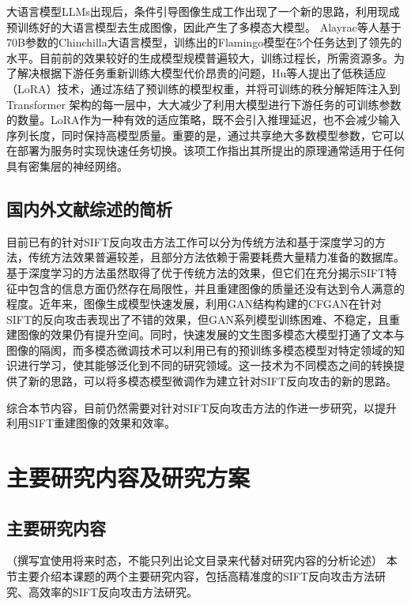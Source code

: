 大语言模型LLMs出现后，条件引导图像生成工作出现了一个新的思路，利用现成预训练好的大语言模型去生成图像，因此产生了多模态大模型\cite{zhang2024mmllmsrecentadvancesmultimodal}。
Alayrac\cite{NEURIPS2022_960a172b}等人基于70B参数的Chinchilla大语言模型，训练出的Flamingo模型在5个任务达到了领先的水平。目前前的效果较好的生成模型规模普遍较大，训练过程长，所需资源多。为了解决根据下游任务重新训练大模型代价昂贵的问题，Hu\cite{hu2021loralowrankadaptationlarge}等人提出了低秩适应（LoRA）技术，通过冻结了预训练的模型权重，并将可训练的秩分解矩阵注入到 Transformer 架构的每一层中，大大减少了利用大模型进行下游任务的可训练参数的数量。LoRA作为一种有效的适应策略，既不会引入推理延迟，也不会减少输入序列长度，同时保持高模型质量。重要的是，通过共享绝大多数模型参数，它可以在部署为服务时实现快速任务切换。该项工作指出其所提出的原理通常适用于任何具有密集层的神经网络。

\subsection{国内外文献综述的简析}
目前已有的针对SIFT反向攻击方法工作可以分为传统方法和基于深度学习的方法，传统方法效果普遍较差，且部分方法依赖于需要耗费大量精力准备的数据库。基于深度学习的方法虽然取得了优于传统方法的效果，但它们在充分揭示SIFT特征中包含的信息方面仍然存在局限性，并且重建图像的质量还没有达到令人满意的程度。近年来，图像生成模型快速发展，利用GAN结构构建的CFGAN在针对SIFT的反向攻击表现出了不错的效果，但GAN系列模型训练困难、不稳定，且重建图像的效果仍有提升空间。同时，快速发展的文生图多模态大模型打通了文本与图像的隔阂，而多模态微调技术可以利用已有的预训练多模态模型对特定领域的知识进行学习，使其能够泛化到不同的研究领域。这一技术为不同模态之间的转换提供了新的思路，可以将多模态模型微调作为建立针对SIFT反向攻击的新的思路。
\par
综合本节内容，目前仍然需要对针对SIFT反向攻击方法的作进一步研究，以提升利用SIFT重建图像的效果和效率。
\section{主要研究内容及研究方案}
\subsection{主要研究内容}
（撰写宜使用将来时态，不能只列出论文目录来代替对研究内容的分析论述）
本节主要介绍本课题的两个主要研究内容，包括高精准度的SIFT反向攻击方法研究、高效率的SIFT反向攻击方法研究。
